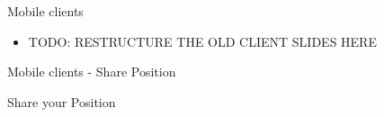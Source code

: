 \documentclass[11pt]{beamer}
\newcommand{\todo}[1]{\raisebox{0pt}{\parbox{0pt}{\begin{large}\colorbox{red}{todo: #1}\end{large} \hspace*{0.05cm}}}}
\begin{document}
\begin{frame}{Mobile clients}

  \begin{itemize}

    \item TODO: RESTRUCTURE THE OLD CLIENT SLIDES HERE

  \end{itemize}

\end{frame}

\begin{frame}{Mobile clients - Share Position}

  Share your Position
  \begin{columns}[T]
	\begin{column}{.4\textwidth}

\end{column}
\end{columns}
\end{frame}
\end{document}
